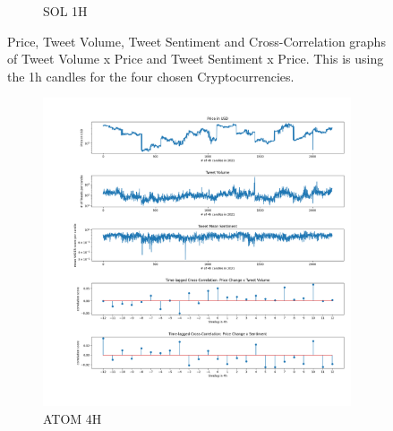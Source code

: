 \documentclass[11pt]{article}
\begin{document}
\begin{figure}[H]
\begin{subfigure}[b]{0.45\textwidth}
         \caption{SOL 1H}
         \label{sol1h}
     \end{subfigure}
        \caption{Price, Tweet Volume, Tweet Sentiment and Cross-Correlation graphs of Tweet Volume x Price and Tweet Sentiment x Price. This is using the 1h candles for the four chosen Cryptocurrencies.}
        \label{fig:crosscorr-1h}
\end{figure}

\begin{figure}[H]
     \centering
     \begin{subfigure}[b]{0.45\textwidth}
         \centering
         \includegraphics[width=\textwidth]{figures/crosscorrATOM_4h_range(-12, 13).png}
         \caption{ATOM 4H}
         \label{atom4h}
     \end{subfigure}
     \hfill 
     \begin{subfigure}[b]{0.45\textwidth}
         \centering

\end{subfigure}
\end{figure}
\end{document}
